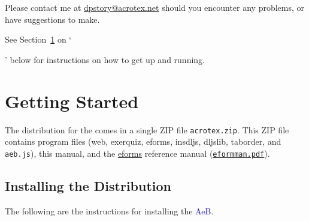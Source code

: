 \documentclass{article}
\def\AEB{\textsf{AeB}}
\def\cAEB{\textcolor{blue}{\AEB}}
\def\bUrl{http://www.math.uakron.edu/~dpstory}
\let\pkg\textsf
\def\AEB{\textsf{AeB}}
\def\bNH{\begin{NoHyper}}\def\eNH{\end{NoHyper}}
\def\nhnameref#1{\bNH\nameref{#1}\eNH}
\begin{document}
Please contact me at \url{dpstory@acrotex.net} should you encounter
any problems, or have suggestions to make.

\redpoint See Section~\ref{s:start} on `\nhnameref{s:start}' below for
instructions on how to get up and running.

\section{Getting Started}\label{s:start}

The distribution for the {\cAcroB} comes in a single ZIP file
  \texttt{acrotex.zip}. This ZIP file contains program files
      (\pkg{web}, \pkg{exerquiz}, \pkg{eforms}, \pkg{insdljs},
      \pkg{dljslib}, \pkg{taborder}, and \texttt{aeb.js}), this manual, and the
        \href{eformman.pdf}{\pkg{eforms}} reference manual
        (\texttt{\href{\bUrl/eformman.pdf}{eformman.pdf}}).

\subsection{Installing the Distribution}

The following are the instructions for installing the \cAEB.
\end{document}
